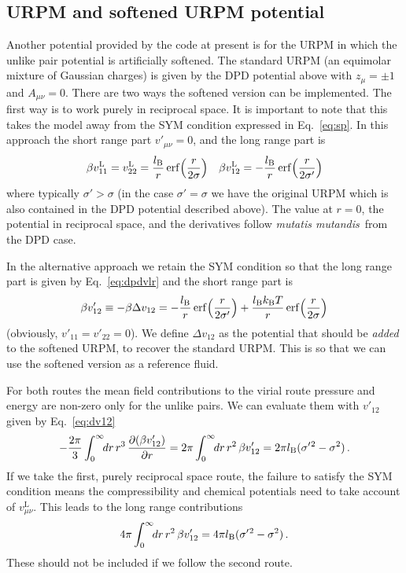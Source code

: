 \documentclass[12pt,a4paper]{article}
\DeclareMathOperator{\erf}{erf}
\newcommand{\latin}[1]{\emph{#1}}
\newcommand{\mutmut}{\latin{mutatis mutandis}}
\newcommand{\kB}{k_{\mathrm{B}}}
\newcommand{\kT}{\kB T}
\newcommand{\lr}{^{\mathrm{L}}}
\newcommand{\sigmap}{{\sigma'}{}}
\newcommand{\Eqref}[1]{Eq.~\eqref{#1}}
\begin{document}
\subsection{URPM and softened URPM potential}
\label{sec:softURPM}
%
Another potential provided by the code at present is for the URPM in
which the unlike pair potential is artificially softened.  The
standard URPM (an equimolar mixture of Gaussian charges) is given by
the DPD potential above with $z_\mu=\pm1$ and $A_{\mu\nu}=0$.  There
are two ways the softened version can be implemented.  The first way
is to work purely in reciprocal space.  It is important to note that
this takes the model away from the SYM condition expressed in
\Eqref{eq:sp}.  In this approach the short range part $v'_{\mu\nu}=0$,
and the long range part is
%
\begin{equation}
\beta v_{11}\lr=v_{22}\lr=\frac{\lB}{r}
\erf\Bigl(\frac{r}{2\sigma}\Bigr)\quad
\beta v_{12}\lr=-\frac{\lB}{r}
\erf\Bigl(\frac{r}{2\sigmap}\Bigr)
\end{equation}
%
where typically $\sigmap>\sigma$ (in the case $\sigmap=\sigma$ we have
the original URPM which is also contained in the DPD potential
described above).  The value at $r=0$, the potential in reciprocal
space, and the derivatives follow \mutmut\ from the DPD case.

In the alternative
approach we retain the SYM condition so that the long range part is
given by \Eqref{eq:dpdvlr} and the short range part is
%
\begin{equation}
\beta v'_{12}\equiv-\beta \Delta v_{12}=-\frac{\lB}{r}
\erf\Bigl(\frac{r}{2\sigmap}\Bigr)
+\frac{\lB\kT}{r}
\erf\Bigl(\frac{r}{2\sigma}\Bigr)
\label{eq:dv12}
\end{equation}
%
(obviously, $v'_{11}=v'_{22}=0$).  We define $\Delta v_{12}$ as the
potential that should be \emph{added} to the softened URPM, to recover
the standard URPM.  This is so that we can use the softened version as
a reference fluid.

For both routes the mean field contributions to the virial route
pressure and energy are non-zero only for the unlike pairs.  We can
evaluate them with $v'_{12}$ given by \Eqref{eq:dv12}
%
\begin{equation}
-\frac{2\pi}{3}\int_0^\infty\!\!dr\,r^3\,
\frac{\partial(\beta
  v'_{12})}{\partial r}={2\pi}\int_0^\infty\!\!dr\,r^2\,
\beta  v'_{12}=2\pi\lB(\sigmap^2-\sigma^2)\,.
\end{equation}
%
If we take the first, purely reciprocal space route, the failure to
satisfy the SYM condition means the compressibility and chemical
potentials need to take account of $v_{\mu\nu}\lr$.  This leads to the
long range contributions 
%
\begin{equation}
{4\pi}\int_0^\infty\!\!dr\,r^2\,\beta
v'_{12}=4\pi\lB(\sigmap^2-\sigma^2)\,.
\end{equation}
%
These should not be included if we follow the second route.
\end{document}
